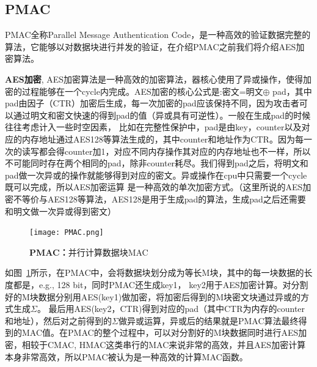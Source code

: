 \subsection{PMAC}
PMAC全称Parallel Message Authentication Code，是一种高效的验证数据完整的算法，它能够以对数据块进行并发的验证，在介绍PMAC之前我们将介绍AES加密算法。

\textbf{AES加密}, AES加密算法是一种高效的加密算法，器核心使用了异或操作，使得加密的过程能够在一个cycle内完成。AES加密的核心公式是:密文=明文$\oplus$ pad，其中pad由因子（CTR）加密后生成，每一次加密的pad应该保持不同，因为攻击者可以通过明文和密文快速的得到pad的值（异或具有可逆性）。一般在生成pad的时候往往考虑计入一些时空因素，
比如在完整性保护中，pad是由key，counter以及对应的内存地址通过AES128等算法生成的，其中counter和地址作为CTR。因为每一次的读写都会得counter加1，对应不同内存操作其对应的内存地址也不一样，所以不可能同时存在两个相同的pad，除非counter耗尽。我们得到pad之后，将明文和pad做一次异或的操作就能够得到对应的密文。异或操作在cpu中只需要一个cycle既可以完成，所以AES加密运算
是一种高效的单次加密方式。（这里所说的AES加密不等价与AES128等算法，AES128是用于生成pad的算法，生成pad之后还需要和明文做一次异或得到密文）
\begin{figure}[!htp]
  \centering
  \texttt{[image: PMAC.png]}
  \caption{\textbf{PMAC：}并行计算数据块MAC}
 \label{fig:PMAC.png}
\end{figure}

如图~\ref{fig:PMAC.png}所示，在PMAC中，会将数据块划分成为等长M块，其中的每一块数据的长度都是，e.g., 128 bit，同时PMAC还生成key1， key2用于AES加密计算。对分割好的M块数据分别用AES(key1)做加密，将加密后得到的M块密文块通过异或的方式生成$\Sigma$。
最后用AES(key2，CTR)得到对应的pad（其中CTR为内存的counter和地址），然后对之前得到的$\Sigma$做异或运算，异或后的结果就是PMAC算法最终得到的MAC值。在PMAC的整个过程中，可以对分割好的M块数据同时进行AES加密，相较于CMAC, HMAC这类串行的MAC来说非常的高效，并且AES加密计算本身非常高效，所以PMAC被认为是一种高效的计算MAC函数。

